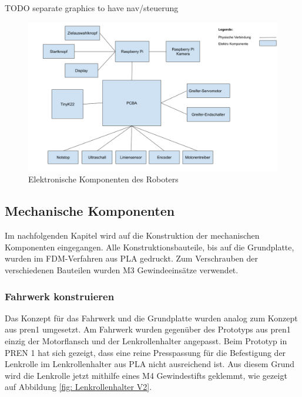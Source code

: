 TODO separate graphics to have nav/steuerung

\begin{figure}[H]
\centering
\includegraphics[width=\textwidth]{assets/gesamtkonzept/electronics.png}
\caption{Elektronische Komponenten des Roboters}
\label{fig:electro-components}
\end{figure} 

\newpage

\subsection{Mechanische Komponenten}
\label{Mechanische Komponenten}

Im nachfolgenden Kapitel wird auf die Konstruktion der mechanischen Komponenten eingegangen. Alle Konstruktionsbauteile, bis auf die Grundplatte, wurden im FDM-Verfahren aus PLA gedruckt. Zum Verschrauben der verschiedenen Bauteilen wurden M3 Gewindeeinsätze verwendet.

\subsubsection{Fahrwerk konstruieren}
\label{Fahrwerk konstruieren}

 Das Konzept für das Fahrwerk und die Grundplatte wurden analog zum Konzept aus \acrshort{pren1} umgesetzt. Am Fahrwerk wurden gegenüber des Prototyps aus \acrshort{pren1} einzig der Motorflansch und der Lenkrollenhalter angepasst. 
 Beim Prototyp in PREN 1 hat sich gezeigt, dass eine reine Presspassung für die Befestigung der Lenkrolle im Lenkrollenhalter aus PLA nicht ausreichend ist. Aus diesem Grund wird die Lenkrolle jetzt mithilfe eines M4 Gewindestifts geklemmt, wie gezeigt auf Abbildung \ref{fig: Lenkrollenhalter V2}.

